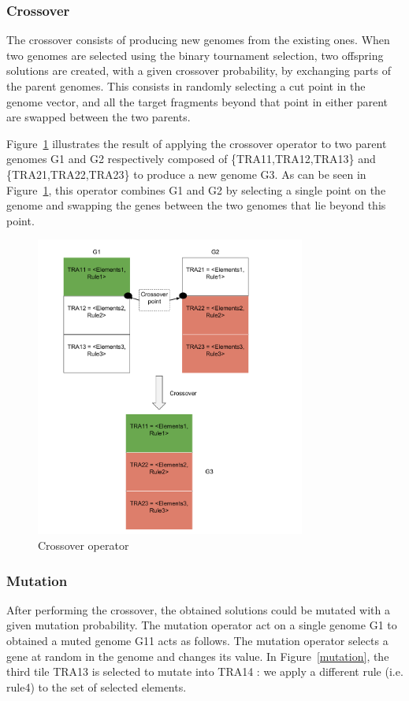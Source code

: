 \documentclass[conference]{IEEEtran}
\begin{document}
\subsubsection{\textbf{Crossover}}
The crossover consists of producing new genomes from the existing ones. When two genomes are selected using the binary tournament selection, two offspring solutions are created, with a given crossover probability, by exchanging parts of the parent genomes. This consists in randomly selecting a cut point in the genome vector, and all the target fragments beyond that point in either parent are swapped between the two parents.

Figure~\ref{crossover} illustrates the result of applying the crossover operator to two parent genomes G1 and G2 respectively composed of \{TRA11,TRA12,TRA13\} and \{TRA21,TRA22,TRA23\} to produce a new genome G3. As can be seen in Figure~\ref{crossover}, this operator combines G1 and G2 by selecting a single point on the genome and swapping the genes between the two genomes that lie beyond this point. 

\begin{figure}[!t]
\centering
\includegraphics[width=3.49in]{crossover.pdf}
\caption{Crossover operator}
\label{crossover}
\end{figure}

\subsubsection{\textbf{Mutation}}
After performing the crossover, the obtained solutions could be mutated with a given mutation probability.
The mutation operator act on a single genome G1 to obtained a muted genome G11 acts as follows. The mutation operator selects a gene at random in the genome and changes its value. In Figure~\ref{mutation}, the third tile TRA13 is selected to mutate into TRA14 : we apply a different rule (i.e. rule4) to the set of selected elements.
\end{document}
